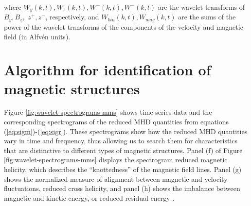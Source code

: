 \noindent where $W_y(k,t),W_z(k,t),W^+(k,t), W^-(k,t)$ are the wavelet transforms of $B_y, B_z,$ $z^+, z^-$, respectively, and $W_{kin}(k,t), W_{mag}(k,t)$ are the sums of the power of the wavelet transforms of the components of the velocity and magnetic field (in Alfv\'en units).



\section{Algorithm for identification of magnetic structures}
Figure \ref{fig:wavelet-spectrograms-mms} shows time series data and the corresponding spectrograms of the reduced MHD quantities from equations (\ref{eq:sigm})-(\ref{eq:sigr}). These spectrograms show how the reduced MHD quantities vary in time and frequency, thus allowing us to search them for characteristics that are distinctive to different types of magnetic structures. Panel (f) of Figure \ref{fig:wavelet-spectrograms-mms} displays the spectrogram reduced magnetic helicity, which describes the “knottedness” of the magnetic field lines. Panel (g) shows the normalized measure of alignment between magnetic and velocity fluctuations, reduced cross helicity, and panel (h) shows the imbalance between magnetic and kinetic energy, or reduced residual energy \cite{Matthaeus:1982}.


